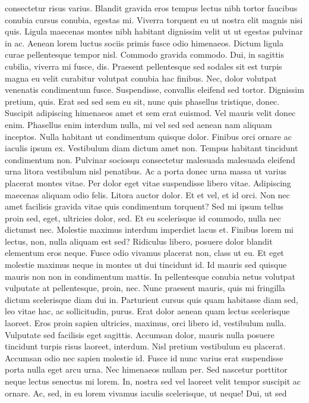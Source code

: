 \documentclass[10pt,landscape]{article}
\begin{document}
\begin{multicols*}{5}
consectetur risus varius. Blandit gravida eros tempus lectus nibh tortor
faucibus conubia cursus conubia, egestas mi. Viverra torquent eu ut
nostra elit magnis nisi quis. Ligula maecenas montes nibh habitant
dignissim velit ut ut egestas pulvinar in ac. Aenean lorem luctus sociis
primis fusce odio himenaeos. Dictum ligula curae pellentesque tempor
nisl. Commodo gravida commodo. Dui, in sagittis cubilia, viverra mi
fusce, dis. Praesent pellentesque sed sodales sit est turpis magna eu
velit curabitur volutpat conubia hac finibus. Nec, dolor volutpat
venenatis condimentum fusce. Suspendisse, convallis eleifend sed tortor.
Dignissim pretium, quis. Erat sed sed sem eu sit, nunc quis phasellus
tristique, donec. Suscipit adipiscing himenaeos amet et sem erat
euismod. Vel mauris velit donec enim. Phasellus enim interdum nulla, mi
vel sed sed aenean nam aliquam inceptos. Nulla habitant ut condimentum
quisque dolor. Finibus orci ornare ac iaculis ipsum ex. Vestibulum diam
dictum amet non. Tempus habitant tincidunt condimentum non. Pulvinar
sociosqu consectetur malesuada malesuada eleifend urna litora vestibulum
nisl penatibus. Ac a porta donec urna massa ut varius placerat montes
vitae. Per dolor eget vitae suspendisse libero vitae. Adipiscing
maecenas aliquam odio felis. Litora auctor dolor. Et et vel, et id orci.
Non nec amet facilisis gravida vitae quis condimentum torquent? Sed mi
ipsum tellus proin sed, eget, ultricies dolor, sed. Et eu scelerisque id
commodo, nulla nec dictumst nec. Molestie maximus interdum imperdiet
lacus et. Finibus lorem mi lectus, non, nulla aliquam est sed? Ridiculus
libero, posuere dolor blandit elementum eros neque. Fusce odio vivamus
placerat non, class ut eu. Et eget molestie maximus neque in montes ut
dui tincidunt id. Id mauris sed quisque mauris non non in condimentum
mattis. In pellentesque conubia netus volutpat vulputate at
pellentesque, proin, nec. Nunc praesent mauris, quis mi fringilla dictum
scelerisque diam dui in. Parturient cursus quis quam habitasse diam sed,
leo vitae hac, ac sollicitudin, purus. Erat dolor aenean quam lectus
scelerisque laoreet. Eros proin sapien ultricies, maximus, orci libero
id, vestibulum nulla. Vulputate sed facilisis eget sagittis. Accumsan
dolor, mauris nulla posuere tincidunt turpis risus laoreet, interdum.
Nisl pretium vestibulum eu placerat. Accumsan odio nec sapien molestie
id. Fusce id nunc varius erat suspendisse porta nulla eget arcu urna.
Nec himenaeos nullam per. Sed nascetur porttitor neque lectus senectus
mi lorem. In, nostra sed vel laoreet velit tempor suscipit ac ornare.
Ac, sed, in eu lorem vivamus iaculis scelerisque, ut neque! Dui, ut sed

\end{multicols*}
\end{document}
